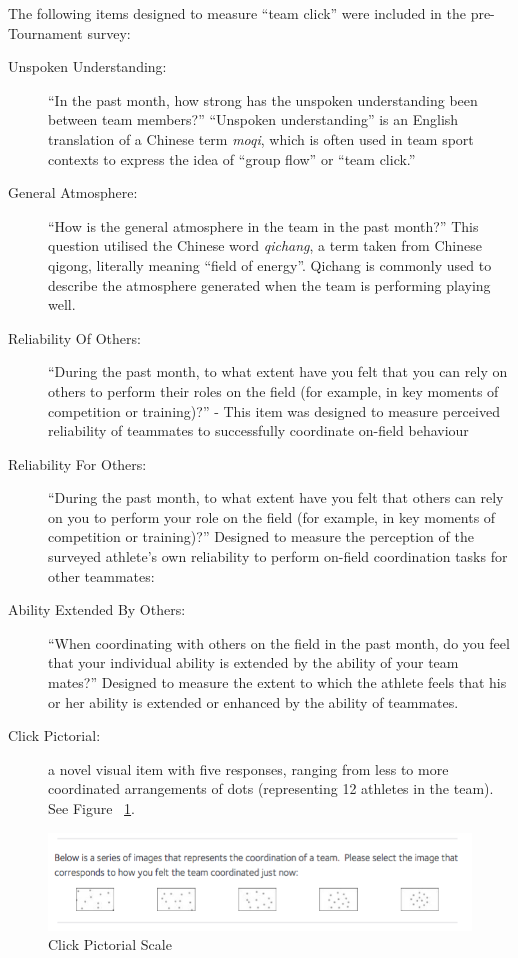 The following items designed to measure ``team click'' were included in the pre-Tournament survey:
\begin{description}
  \item [Unspoken Understanding:] ``In the past month, how strong has the unspoken understanding been between team members?''  ``Unspoken understanding'' is an English translation of a Chinese term \textit{moqi}, which is often used in team sport contexts to express the idea of  ``group flow'' or ``team click.''
  \item [General Atmosphere:] ``How is the general atmosphere in the team in the past month?'' This question utilised the Chinese word \textit{qichang}, a term taken from Chinese qigong, literally meaning ``field of energy''. Qichang is commonly used to describe the atmosphere generated when the team is performing playing well.


  \item [Reliability Of Others:] ``During the past month, to what extent have you felt that you can rely on others to perform their roles on the field (for example, in key moments of competition or training)?'' - This item was designed to measure perceived reliability of teammates to successfully coordinate  on-field behaviour
  \item [Reliability For Others:] ``During the past month, to what extent have you felt that others can rely on you to perform your role on the field (for example, in key moments of competition or training)?'' Designed to measure the perception of the surveyed athlete's own reliability to perform on-field coordination tasks for other teammates:
  \item[Ability Extended By Others:] ``When coordinating with others on the field in the past month, do you feel that your individual ability is extended by the ability of your team mates?'' Designed to measure the extent to which the athlete feels that his or her ability is extended or enhanced by the ability of teammates.
  \item [Click Pictorial:] a novel visual item with five responses, ranging from less to more coordinated arrangements of dots (representing 12 athletes in the team). See Figure ~\ref{fig:clickPictorial}.
\end{description}

    \begin{figure}[htbp]
      \includegraphics[width = \linewidth]{images/teamClickPictorial.png}
      \caption{Click Pictorial Scale}
      \label{fig:clickPictorial}
    \end{figure}


